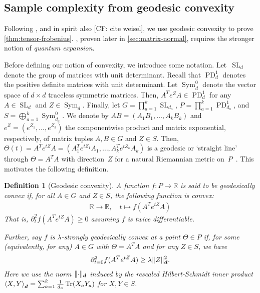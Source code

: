 \documentclass{article}
\newtheorem{definition}{Definition}
\DeclarePairedDelimiter{\norm}{\lVert}{\rVert}
\newcommand{\R}{{\mathbb{R}}}
\renewcommand{\vec}{\bm}
\newcommand\SL{\operatorname{SL}}
\newcommand\PD{\operatorname{PD}}
\newcommand\Sym{\operatorname{Sym}}
\newcommand\tr{\operatorname{Tr}}
\newcommand{\CF}[1]{{\color{purple}[CF: #1]}}
\begin{document}
\subsection{Sample complexity from geodesic convexity}\label{subsec:outline}
Following \cite{FM20}, and in spirit also \CF{cite weisel}, we use geodesic convexity to prove \cref{thm:tensor-frobenius}.
, proven later in \cref{sec:matrix-normal}, requires the stronger notion of \emph{quantum expansion}.

Before defining our notion of convexity, we introduce some notation.
Let~$\SL_d$ denote the group of matrices with unit determinant.
Recall that $\PD_d^1$ denotes the positive definite matrices with unit determinant.
Let $\Sym_d^0$ denote the vector space of $d\times d$ traceless symmetric matrices.
Then, $A^T e^Z A \in \PD_d^1$ for any $A \in \SL_d$ and $Z\in\Sym_d$.
Finally, let $G = \prod_{a=1}^k \SL_{d_a}$, $P = \prod_{a=1}^k \PD_{d_a}^1$, and $S = \bigoplus_{a=1}^k \Sym_{d_a}^0$.
We denote by $AB=(A_1B_1,\dots,A_kB_k)$ and $e^Z=(e^{Z_1},\dots,e^{Z_k})$ the componentwise product and matrix exponential, respectively, of matrix tuples $A, B \in G$ and $Z\in S$.
Then, $\Theta(t) = A^T e^{tZ} A = (A_1^T e^{t Z_1} A_1, \dots, A_k^T e^{t Z_k} A_k)$ is a geodesic or `straight line' through $\Theta = A^T A$ with direction~$Z$ for a natural Riemannian metric on~$P$~\cite{bhatia2009positive}.
This motivates the following definition.

\begin{definition}[Geodesic convexity]
A function $f\colon P \to \R$ is said to be \emph{geodesically convex} if, for all $A \in G$ and $Z \in S$, the following function is convex:
\begin{align*}
  \R \to \R, \quad t \mapsto f(A^T e^{t Z} A)
\end{align*}
That is, $\partial^2_t f(A^T e^{t Z} A) \geq 0$ assuming $f$ is twice differentiable.

Further, say $f$ is \emph{$\lambda$-strongly geodesically convex} at a point $\Theta \in P$ if, for some (equivalently, for any) $A \in G$ with $\Theta = A^T A$ and for any $Z \in S$, we have
\begin{align*}
  \partial^2_{t=0} f(A^T e^{t Z} A) \geq \lambda \norm{Z}_{\vec d}^2.
\end{align*}
Here we use the norm $\norm{\cdot}_{\vec d}$ induced by the rescaled Hilbert-Schmidt inner product $\braket{X, Y}_{\vec d} = \sum_{a=1}^k \frac1{d_a} \tr(X_a Y_a)$ for $X, Y \in S$.
\end{definition}
\end{document}

